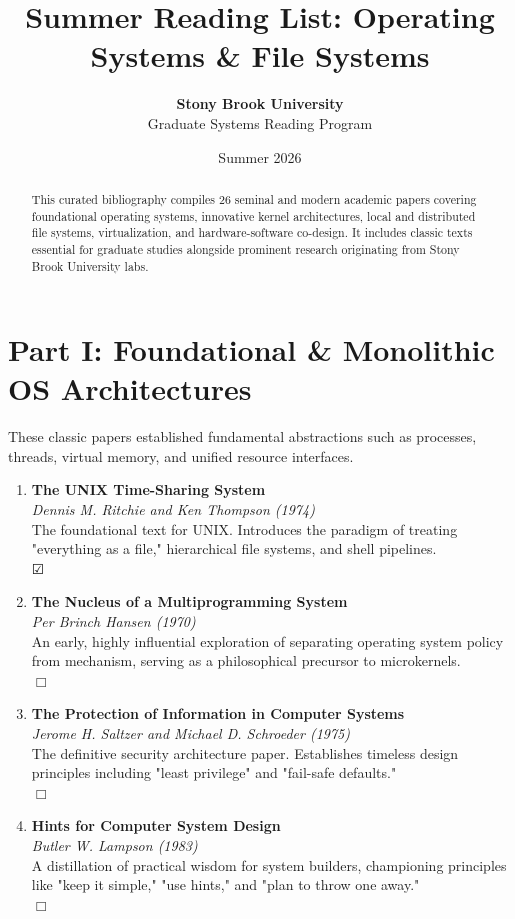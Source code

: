 \documentclass[11pt,a4paper]{article}
\title{\textbf{Summer Reading List: Operating Systems \& File Systems}}
\author{\textbf{Stony Brook University} \\ Graduate Systems Reading Program}
\date{Summer 2026}
\begin{document}
\maketitle

\begin{abstract}
This curated bibliography compiles 26 seminal and modern academic papers covering foundational operating systems, innovative kernel architectures, local and distributed file systems, virtualization, and hardware-software co-design. It includes classic texts essential for graduate studies alongside prominent research originating from Stony Brook University labs.
\end{abstract}

\section{Part I: Foundational \& Monolithic OS Architectures}
These classic papers established fundamental abstractions such as processes, threads, virtual memory, and unified resource interfaces.

\begin{enumerate}
    \item \textbf{The UNIX Time-Sharing System} \\
    \textit{Dennis M. Ritchie and Ken Thompson (1974)} \\
    The foundational text for UNIX. Introduces the paradigm of treating "everything as a file," hierarchical file systems, and shell pipelines. \\
    $\CheckedBox$
    
    \item \textbf{The Nucleus of a Multiprogramming System} \\
    \textit{Per Brinch Hansen (1970)} \\
    An early, highly influential exploration of separating operating system policy from mechanism, serving as a philosophical precursor to microkernels. \\
    $\Box$
    
    \item \textbf{The Protection of Information in Computer Systems} \\
    \textit{Jerome H. Saltzer and Michael D. Schroeder (1975)} \\
    The definitive security architecture paper. Establishes timeless design principles including "least privilege" and "fail-safe defaults." \\
    $\Box$
    
    \item \textbf{Hints for Computer System Design} \\
    \textit{Butler W. Lampson (1983)} \\
    A distillation of practical wisdom for system builders, championing principles like "keep it simple," "use hints," and "plan to throw one away." \\
    $\Box$
\end{enumerate}
\end{document}
